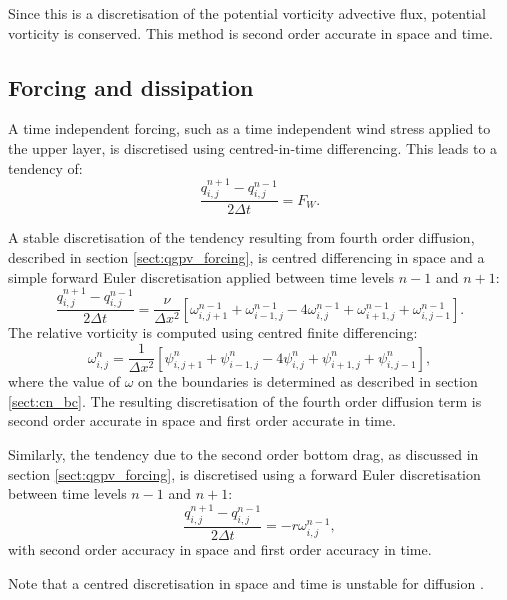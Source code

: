 \documentclass[a4paper]{book}
\begin{document}
Since this is a discretisation of the potential vorticity advective flux,
potential vorticity is conserved. This method is second order accurate in space
and time.

\subsection{Forcing and dissipation}\label{sect:cn_forcing}

A time independent forcing, such as a time independent wind stress applied to
the upper layer, is discretised using centred-in-time differencing. This
leads to a tendency of:
\begin{equation}
  \frac{q^{n + 1}_{i,j} - q^{n - 1}_{i,j}}{2 \Delta t} = F_W.
\end{equation}

A stable discretisation of the tendency resulting from fourth order diffusion,
described in section \ref{sect:qgpv_forcing}, is centred differencing
in space and a simple forward Euler discretisation applied between time levels
$n - 1$ and $n + 1$:
\begin{equation}
  \frac{q^{n + 1}_{i,j} - q^{n - 1}_{i,j}}{2 \Delta t} = \frac{\nu}{\Delta x^2} \left[ \omega^{n - 1}_{i,j + 1} + \omega^{n - 1}_{i - 1,j} - 4 \omega^{n - 1}_{i,j} + \omega^{n - 1}_{i + 1,j} + \omega^{n - 1}_{i,j - 1} \right].
\end{equation}
The relative vorticity is computed using centred finite differencing:
\begin{equation}
  \omega^n_{i,j} = \frac{1}{\Delta x^2} \left[ \psi^n_{i,j + 1} + \psi^n_{i - 1,j} - 4 \psi^n_{i,j} + \psi^n_{i + 1,j} + \psi^n_{i,j - 1} \right],
\end{equation}
where the value of $\omega$ on the boundaries is determined as described in
section \ref{sect:cn_bc}. The resulting
discretisation of the fourth order diffusion term is second order
accurate in space and first order accurate in time.

Similarly, the tendency due to the second order bottom drag, as discussed in section
\ref{sect:qgpv_forcing}, is discretised using a forward Euler discretisation
between time levels $n - 1$ and $n + 1$:
\begin{equation}
  \frac{q^{n + 1}_{i,j} - q^{n - 1}_{i,j}}{2 \Delta t} = -r \omega^{n - 1}_{i,j},
\end{equation}
with second order accuracy in space and first order accuracy in time.

Note that a centred discretisation in space and time is unstable for diffusion
\citep{haltiner1980}.
\end{document}

